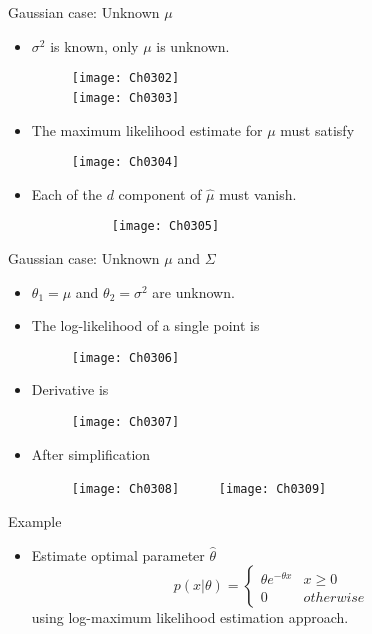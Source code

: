 \begin{frame}{Gaussian case: Unknown $\mu$}
\begin{itemize}
\item $\sigma^2$ is known, only $\mu$ is unknown.
\begin{figure}
\texttt{[image: Ch0302]}\\
\texttt{[image: Ch0303]}~~~~~~~~~
\end{figure}
\item The maximum likelihood estimate for $\mu$ must satisfy
\begin{figure}
\texttt{[image: Ch0304]}
\end{figure}
\item Each of the $d$ component of $\hat{\mu}$ must vanish.
\begin{figure}
\begin{figure}
\texttt{[image: Ch0305]}
\end{figure}
\end{figure}
\end{itemize}
\end{frame}

\begin{frame}{Gaussian case: Unknown $\mu$ and $\Sigma$}
\begin{itemize}
\item $\theta_1 = \mu$ and $\theta_2=\sigma^2$ are unknown.
\item The log-likelihood of a single point is
\begin{figure}
\texttt{[image: Ch0306]}
\end{figure}
\item Derivative is
\begin{figure}
\texttt{[image: Ch0307]}
\end{figure}
\item After simplification
\begin{figure}
\texttt{[image: Ch0308]}~~~~~
\texttt{[image: Ch0309]}
\end{figure}
\end{itemize}
\end{frame}

\begin{frame}{Example}
\begin{itemize}
\item Estimate optimal parameter $\hat{\theta}$
\begin{equation}
p(x|\theta ) = \left\{ {\begin{array}{*{20}{c}}
{\theta {e^{ - \theta x}}}&{x \ge 0}\\
0&{otherwise}
\end{array}} \right.\nonumber
\end{equation}
using log-maximum likelihood estimation approach.
\end{itemize}
\end{frame}

